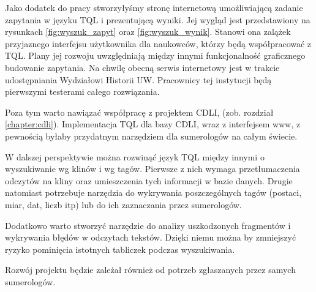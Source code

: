Jako dodatek do pracy stworzyłyśmy stronę internetową umożliwiającą zadanie zapytania w języku TQL i prezentującą wyniki. 
Jej wygląd jest przedstawiony na rysunkach \ref{fig:wyszuk_zapyt} oraz \ref{fig:wyszuk_wynik}.
Stanowi ona zalążek przyjaznego interfejsu użytkownika dla naukowców, którzy będą współpracować z TQL. Plany jej rozwoju
uwzględniają między innymi funkcjonalność graficznego budowanie zapytania.
Na chwilę obecną serwis internetowy jest w trakcie udostępniania Wydziałowi Historii UW.
Pracownicy tej instytucji będą pierwszymi testerami całego rozwiązania.

Poza tym warto nawiązać współpracę z projektem CDLI, (zob. rozdział \ref{chapter:cdli}).
Implementacja TQL dla bazy CDLI, wraz z interfejsem www, z pewnością byłaby przydatnym narzędziem dla sumerologów na całym świecie.

W dalszej perspektywie można rozwinąć język TQL między innymi o wyszukiwanie wg klinów i wg tagów. 
Pierwsze z nich wymaga przetłumaczenia odczytów na kliny oraz umieszczenia tych informacji w bazie danych.
Drugie natomiast potrzebuje narzędzia do wykrywania poszczególnych tagów
(postaci, miar, dat, liczb itp) lub do ich zaznaczania przez sumerologów.

Dodatkowo warto stworzyć narzędzie do analizy uszkodzonych fragmentów i wykrywania błędów w odczytach tekstów. 
Dzięki niemu można by zmniejszyć ryzyko pominięcia istotnych tabliczek podczas wyszukiwania. 

Rozwój projektu będzie zależał również od potrzeb zgłaszanych przez samych sumerologów.
